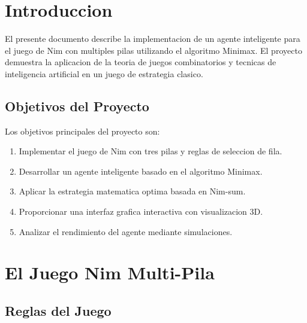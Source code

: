 \documentclass[12pt,a4paper]{article}
\theoremstyle{definition}
\begin{document}
\tableofcontents
\newpage

\section{Introduccion}

El presente documento describe la implementacion de un agente inteligente para el juego de Nim con multiples pilas utilizando el algoritmo Minimax. El proyecto demuestra la aplicacion de la teoria de juegos combinatorios y tecnicas de inteligencia artificial en un juego de estrategia clasico.

\subsection{Objetivos del Proyecto}

Los objetivos principales del proyecto son:

\begin{enumerate}
    \item Implementar el juego de Nim con tres pilas y reglas de seleccion de fila.
    \item Desarrollar un agente inteligente basado en el algoritmo Minimax.
    \item Aplicar la estrategia matematica optima basada en Nim-sum.
    \item Proporcionar una interfaz grafica interactiva con visualizacion 3D.
    \item Analizar el rendimiento del agente mediante simulaciones.
\end{enumerate}

\section{El Juego Nim Multi-Pila}

\subsection{Reglas del Juego}
\end{document}
